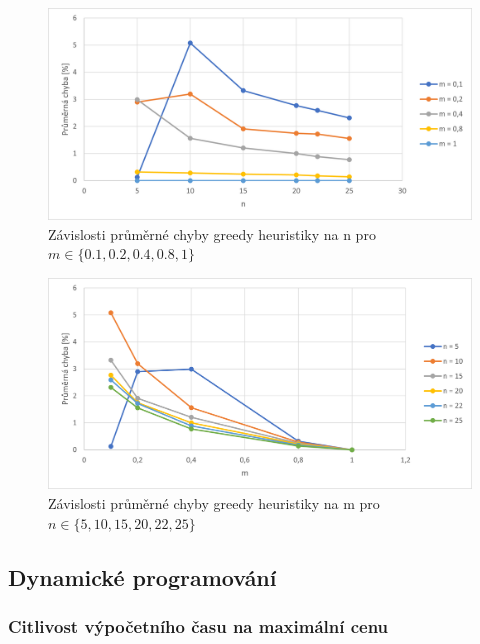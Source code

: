 \documentclass[12pt]{article}
\begin{document}
\begin{figure}[ht]\centering
    \includegraphics[width=1\textwidth, keepaspectratio]{graphs/greedy/sum_weight/greedy_sum_weight_error_n_dep.png}
    \caption{Závislosti průměrné chyby greedy heuristiky na n pro $m \in \{0.1, 0.2, 0.4, 0.8, 1\}$}
    \label{fig:greedy_sum_weight_error_n_dep}
\end{figure}

\begin{figure}[ht]\centering
    \includegraphics[width=1\textwidth, keepaspectratio]{graphs/greedy/sum_weight/greedy_sum_weight_error_m_dep.png}
    \caption{Závislosti průměrné chyby greedy heuristiky na m pro $n \in \{5, 10, 15, 20, 22, 25\}$}
    \label{fig:greedy_sum_weight_error_m_dep}
\end{figure}

\subsection{Dynamické programování}

\subsubsection{Citlivost výpočetního času na maximální cenu}
\end{document}

